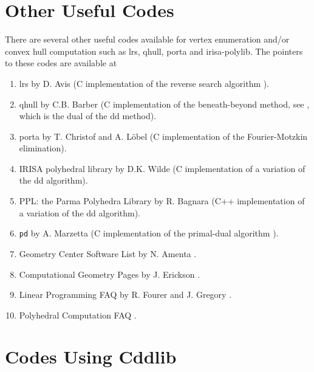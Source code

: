 \documentclass[11pt]{article}
\newcommand {\0} {{\bf 0}}
\begin{document}
\section{Other Useful Codes}  \label{CODES}
There are several other useful codes available for vertex enumeration and/or
convex hull computation  such as lrs, qhull, porta and irisa-polylib.
The pointers to these codes are available at
\begin{enumerate}
\item lrs by D. Avis \cite{a-lrshome-01} (C implementation of the reverse search algorithm
\cite{af-pachv-92}).

\item qhull by C.B. Barber \cite{bdh-qach-03} (C implementation of
the beneath-beyond method, see \cite{e-acg-87,m-cg-94},
which is the dual of the dd method).

\item porta by T. Christof and A. L{\"o}bel \cite{cl-porta-97} (C implementation
of the Fourier-Motzkin elimination).

\item IRISA polyhedral library by D.K. Wilde
\cite{w-ldpo-93b} (C implementation
of a variation of the dd algorithm).

\item PPL: the Parma Polyhedra Library \cite{b-pplhome} by R. Bagnara (C++ implementation of
a variation of the dd algorithm).

\item {\tt pd} by A. Marzetta \cite{m-pdcip-97} (C implementation of the primal-dual algorithm
\cite{bfm-pdmvf-97}).

 \item Geometry Center Software List by N. Amenta \cite{a-dcg}.

 \item Computational Geometry Pages by J. Erickson \cite{e-cgp}.

 \item Linear Programming FAQ by R. Fourer and J. Gregory \cite{fg-lpfaq}.


\item Polyhedral Computation FAQ \cite{f-pcfaq-98}.
\end{enumerate}

\section{Codes Using Cddlib}  \label{USERCODES}
\end{document}
